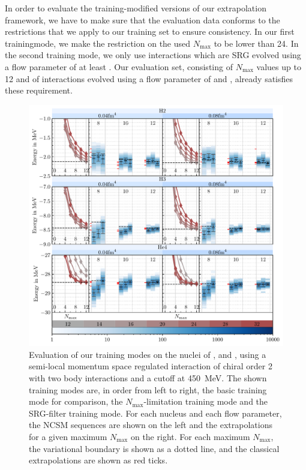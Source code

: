 In order to evaluate the training-modified versions of our extrapolation framework, we have to make sure that the evaluation data conforms to the restrictions that we apply to our training set to ensure consistency. In our first trainingmode, we make the restriction on the used $N_\mathrm{max}$ to be lower than 24. In the second training mode, we only use interactions which are SRG evolved using a flow parameter of at least . Our evaluation set, consisting of $N_\mathrm{max}$ values up to 12 and of interactions evolved using a flow parameter of  and , already satisfies these requirement.
\begin{figure}[H]
  \includegraphics[width=\textwidth]{media/extended_evaluation.pdf}
  \caption{Evaluation of our training modes on the nuclei of ,  and , using a semi-local momentum space regulated interaction of chiral order 2 with two body interactions and a cutoff at \SI{450}{\mega\electronvolt}. The shown training modes are, in order from left to right, the basic training mode for comparison, the $N_\mathrm{max}$-limitation training mode and the SRG-filter training mode. For each nucleus and each flow parameter, the NCSM sequences are shown on the left and the extrapolations for a given maximum $N_\mathrm{max}$ on the right. For each maximum $N_\mathrm{max}$, the variational boundary is shown as a dotted line, and the classical extrapolations are shown as red ticks.}
  \label{fig:eval_extended}
\end{figure}

